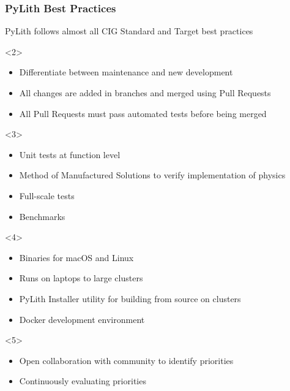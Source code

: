 \documentclass[aspectratio=169]{beamer}
\begin{document}
\begin{frame}[t]
  \frametitle{PyLith Best Practices}
  \summary{}

  PyLith follows almost all CIG Standard and Target best practices
  \begin{itemize}
     
    \begin{onlyenv}<2>
      \begin{itemize}
      \item Differentiate between maintenance and new development
      \item All changes are added in branches and merged using Pull Requests
      \item All Pull Requests must pass automated tests before being merged
      \end{itemize}
    \end{onlyenv}
    \begin{onlyenv}<3>
      \begin{itemize}
      \item Unit tests at function level
      \item Method of Manufactured Solutions to verify implementation of physics
      \item Full-scale tests
      \item Benchmarks
      \end{itemize}
    \end{onlyenv}
    \begin{onlyenv}<4>
      \begin{itemize}
      \item Binaries for macOS and Linux
      \item Runs on laptops to large clusters
      \item PyLith Installer utility for building from source on clusters
      \item Docker development environment
      \end{itemize}
    \end{onlyenv}
     \url{}
    \begin{onlyenv}<5>
      \begin{itemize}
      \item Open collaboration with community to identify priorities
      \item Continuously evaluating priorities
      \end{itemize}
    \end{onlyenv}
  \end{itemize}

\end{frame}
\end{document}
